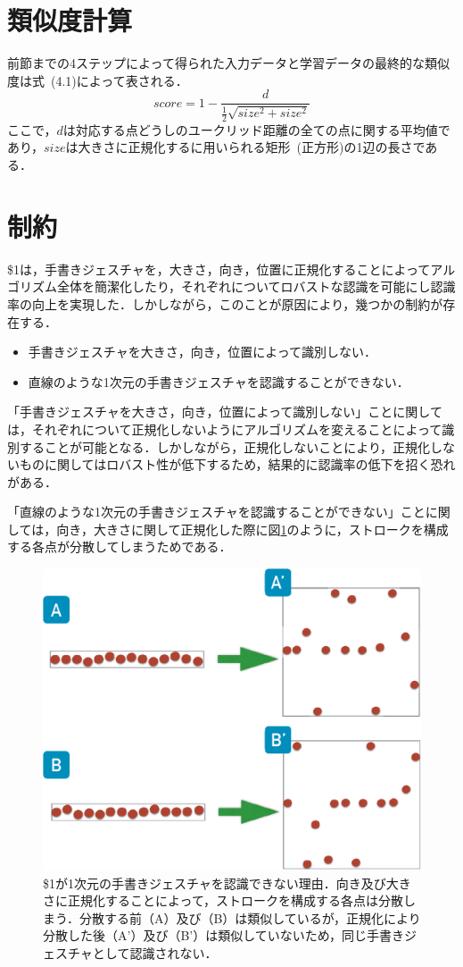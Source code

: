 \section{類似度計算}
前節までの4ステップによって得られた入力データと学習データの最終的な類似度は式~(4.1)によって表される．
\begin{equation}
score = 1 - \frac{d}{\frac{1}{2}\sqrt{size^2 + size^2}}
\end{equation}
ここで，$d$は対応する点どうしのユークリッド距離の全ての点に関する平均値であり，$size$は大きさに正規化するに用いられる矩形~(正方形)の1辺の長さである．

\section{制約}
\$1は，手書きジェスチャを，大きさ，向き，位置に正規化することによってアルゴリズム全体を簡潔化したり，それぞれについてロバストな認識を可能にし認識率の向上を実現した．しかしながら，このことが原因により，幾つかの制約が存在する．

\begin{itemize}
\item 手書きジェスチャを大きさ，向き，位置によって識別しない．
\item 直線のような1次元の手書きジェスチャを認識することができない．
\end{itemize}


「手書きジェスチャを大きさ，向き，位置によって識別しない」ことに関しては，それぞれについて正規化しないようにアルゴリズムを変えることによって識別することが可能となる．しかしながら，正規化しないことにより，正規化しないものに関してはロバスト性が低下するため，結果的に認識率の低下を招く恐れがある．

「直線のような1次元の手書きジェスチャを認識することができない」ことに関しては，向き，大きさに関して正規化した際に図\ref{fig:line}のように，ストロークを構成する各点が分散してしまうためである．

\begin{figure} [!h]
\centering
\includegraphics [width=0.6\columnwidth]{img/line.eps}
\caption{\$1が1次元の手書きジェスチャを認識できない理由．向き及び大きさに正規化することによって，ストロークを構成する各点は分散しまう．分散する前（A）及び（B）は類似しているが，正規化により分散した後（A'）及び（B'）は類似していないため，同じ手書きジェスチャとして認識されない．}
\label{fig:line}
\end{figure}

